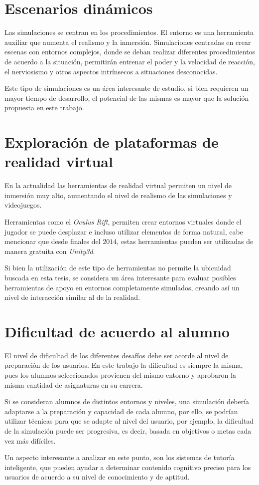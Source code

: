 \section{Escenarios dinámicos}

Las simulaciones se centran en los procedimientos. El entorno es una herramienta
auxiliar que aumenta el realismo y la inmersión. Simulaciones centradas en crear
escenas con entornos complejos, donde se deban realizar diferentes
procedimientos de acuerdo a la situación, permitirán entrenar el poder y la
velocidad de reacción, el nerviosismo y otros aspectos intrínsecos a situaciones
desconocidas. 

Este tipo de simulaciones es un área interesante de estudio, si bien requieren
un mayor tiempo de desarrollo, el potencial de las mismas es mayor que la
solución propuesta en este trabajo. 

\section{Exploración de plataformas de realidad virtual}

En la actualidad las herramientas de realidad virtual permiten un nivel de
inmersión muy alto, aumentando el nivel de realismo de las simulaciones y
videojuegos.     

Herramientas como el \emph{Oculus Rift}, permiten crear entornos virtuales donde
el jugador se puede desplazar e incluso utilizar elementos de forma
natural\cite{makerbot}, cabe mencionar que desde finales del $2014$, estas
herramientas pueden ser utilizadas de manera gratuita con
\emph{Unity3d}\cite{unity:vr}.

Si bien la utilización de este tipo de herramientas no permite la ubicuidad
buscada en esta tesis, se considera un área interesante para evaluar posibles
herramientas de apoyo en entornos completamente simulados, creando así un nivel
de interacción similar al de la realidad.


\section{Dificultad de acuerdo al alumno}

El nivel de dificultad de los diferentes desafíos debe ser acorde al nivel de
preparación de los usuarios. En este trabajo la dificultad es siempre la misma,
pues los alumnos seleccionados provienen del mismo entorno y aprobaron la misma
cantidad de asignaturas en su carrera.

Si se consideran alumnos de distintos entornos y niveles, una simulación debería
adaptarse a la preparación y capacidad de cada alumno, por ello, se podrían
utilizar técnicas para que se adapte al nivel del usuario, por ejemplo, la
dificultad de la simulación puede ser progresiva, es decir, basada en objetivos
o metas cada vez más difíciles.

Un aspecto interesante a analizar en este punto, son los sistemas de tutoría
inteligente, que pueden ayudar a determinar contenido cognitivo preciso para los
usuarios de acuerdo a su nivel de conocimiento y de aptitud.
